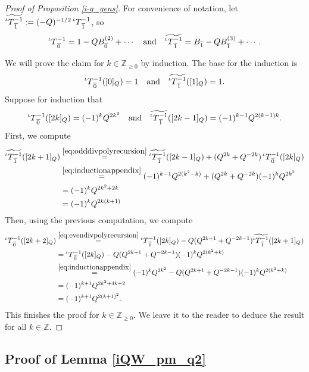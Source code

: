 \documentclass[10pt]{amsart}
\numberwithin{equation}{section}
\theoremstyle{definition}
\newcommand{\iQW}{\prescript{\iota}{}{T}}
\begin{document}
\begin{proof}[Proof of Proposition \ref{i-q_gens}]
For convenience of notation, let $\widetilde{\iQW^{-1}_{\overline{1}}}:=(-Q)^{-1/2}\iQW^{-1}_{\overline{1}}$, so
\[
\iQW^{-1}_{\overline{0}} = 1- QB_{\overline{0}}^{(2)} + \cdots \quad \text{and} \quad \widetilde{\iQW^{-1}_{\overline{1}}} = B_{\overline{1}} - QB_{\overline{1}}^{(3)} + \cdots .
\]

We will prove the claim for $k\in \mathbb{Z}_{\ge 0}$ by induction. The base for the induction is
\[
    \iQW^{-1}_{\overline{0}}([0]_Q)=1 \quad \text{and} \quad \widetilde{\iQW^{-1}_{\overline{1}}}([1]_Q)=1.
\]
Suppose for induction that
\begin{equation}\label{eq:inductionappendix}
    \iQW^{-1}_{\overline{0}}([2k]_Q)=(-1)^k Q^{2k^2}\quad \text{and} \quad \widetilde{\iQW^{-1}_{\overline{1}}}([2k-1]_Q)=(-1)^{k-1}Q^{2(k-1)k}.
\end{equation}
First, we compute
\begin{align*}
    \widetilde{\iQW^{-1}_{\overline{1}}}([2k+1]_Q) &\stackrel{\eqref{eq:odddivpolyrecursion}}{=}\widetilde{\iQW^{-1}_{\overline{1}}}([2k-1]_Q) + (Q^{2k}+Q^{-2k})\iQW^{-1}_{\overline{0}}([2k]_Q) \\
    &\stackrel{\eqref{eq:inductionappendix}}{=}(-1)^{k-1}Q^{2(k^2-k)} +(Q^{2k}+Q^{-2k})(-1)^kQ^{2k^2}\\
    &=(-1)^kQ^{2k^2+2k} \\
    &=(-1)^kQ^{2k(k+1)}
\end{align*}
Then, using the previous computation, we compute 
\begin{align*}
    \iQW^{-1}_{\overline{0}}([2k+2]_Q)&\stackrel{\eqref{eq:evendivpolyrecursion}}{=}\iQW^{-1}_{\overline{0}}([2k]_Q)-Q(Q^{2k+1}+Q^{-2k-1}) \widetilde{\iQW^{-1}_{\overline{1}}}([2k+1]_Q)\\
    &=\iQW^{-1}_{\overline{0}}([2k]_Q)-Q(Q^{2k+1}+Q^{-2k-1})(-1)^k Q^{2(k^2+k)}\\
    &\stackrel{\eqref{eq:inductionappendix}}{=}(-1)^kQ^{2k^2}-Q(Q^{2k+1}+Q^{-2k-1})(-1)^k Q^{2(k^2+k)}\\
    &=(-1)^{k+1}Q^{2k^2+4k+2}\\
    &=(-1)^{k+1}Q^{2(k+1)^2}.
\end{align*}
This finishes the proof for $k\in \mathbb{Z}_{\ge 0}$. We leave it to the reader to deduce the result for all $k\in \mathbb{Z}$.
\end{proof}

\subsection{Proof of Lemma \ref{iQW_pm_q2}}\label{prooflem6.4}
\end{document}
